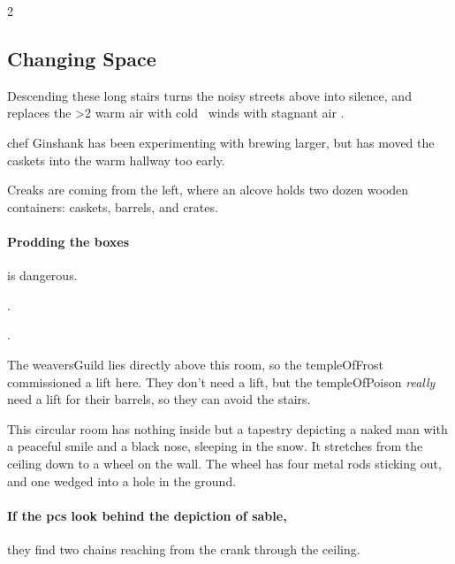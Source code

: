 \begin{multicols}{2}
\subsection{Changing Space}


Descending these long stairs turns the noisy streets above into silence, and replaces the
\ifnum\value{temperature}>2%
  warm air with cold%
\else%
  \showTemperature\ winds with stagnant air%
\fi.

\begin{exampletext}
  \Gls{chef} Ginshank has been experimenting with brewing larger, but has moved the caskets into the warm hallway too early.
\end{exampletext}

\begin{boxtext}
  Creaks are coming from the left, where an alcove holds two dozen wooden containers: caskets, barrels, and crates.
\end{boxtext}

\paragraph{Prodding the boxes}
is dangerous.

.

.


\begin{exampletext}
  The \gls{weaversGuild} lies directly above this room, so the \gls{templeOfFrost} commissioned a lift here.
  They don't need a lift, but the \gls{templeOfPoison} \emph{really} need a lift for their barrels, so they can avoid the stairs.
\end{exampletext}

\begin{boxtext}
  This circular room has nothing inside but a tapestry depicting a naked man with a peaceful smile and a black nose, sleeping in the snow.
  It stretches from the ceiling down to a wheel on the wall.
  The wheel has four metal rods sticking out, and one wedged into a hole in the ground.
\end{boxtext}

\paragraph{If the \glspl{pc} look behind the depiction of \gls{sable},}
they find two chains reaching from the crank through the ceiling.


\end{multicols}
